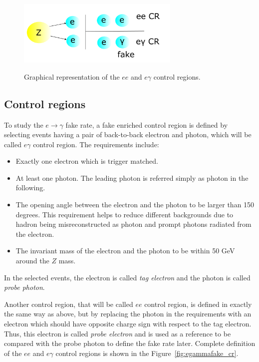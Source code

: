 \begin{figure}[!htbp]
\centering
{\includegraphics[width=0.69\textwidth]{figures/efake_CRs.png}}
\caption [] {Graphical representation of the $ee$ and $e\gamma$ control regions.}
\label{fig:egammafake_cr_toy}
\end{figure} 


\subsection{Control regions}
\label{sec:egammafakes_cr}

To study the $e\to\gamma$ fake rate, a fake enriched control region is defined by selecting events having a pair of back-to-back electron and photon, which will be called $e\gamma$ control region. The requirements include:
\begin{itemize}
\item Exactly one electron which is trigger matched.
\item At least one photon. The leading \pt photon is referred simply as photon in the following.
\item The opening angle between the electron and the photon to be larger than 150 degrees. This requirement helps to reduce different backgrounds due to hadron being misreconstructed as photon and prompt photons radiated from the electron.
\item The invariant mass of the electron and the photon to be within 50 GeV around the $Z$ mass. 
\end{itemize}
In the selected events, the electron is called \textit{tag electron} and the photon is called \textit{probe photon}.

Another control region, that will be called $ee$ control region, is defined in exactly the same way as above, but by replacing the photon in the requirements with an electron which should have opposite charge sign with respect to the tag electron. Thus, this electron is called \textit{probe electron} and is used as a reference to be compared with the probe photon to define the fake rate later. Complete definition of the $ee$ and $e\gamma$ control regions is shown in the Figure~\ref{fig:egammafake_cr}.

